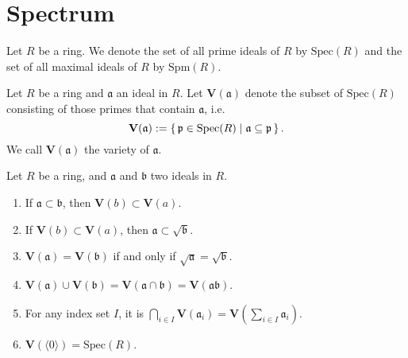 \chapter{Spectrum}

\begin{defn}[Spectrum]
    Let \(R\) be a ring. We denote the set of all prime ideals of \(R\) by \(\mathrm{Spec}(R)\) and the set of all maximal ideals of \(R\) by \(\mathrm{Spm}(R)\).
\end{defn}

\begin{defn}[Variety]
    Let \(R\) be a ring and \(\mathfrak{a}\) an ideal in \(R\). Let \(\mathbf{V}(\mathfrak{a})\) denote the subset of \(\mathrm{Spec}(R)\) consisting of those primes that contain \(\mathfrak{a}\), i.e.
    \begin{equation}
        \mathbf{V}(\mathfrak{a}) := \left\{\, \mathfrak{p} \in \mathrm{Spec}(R) \mathrel{\mid} \mathfrak{a} \subseteq \mathfrak{p} \,\right\}\text{.}
    \end{equation}
    We call \(\mathbf{V}(\mathfrak{a})\) the variety of \(\mathfrak{a}\).
\end{defn}

\begin{prps}
    Let \(R\) be a ring, and \(\mathfrak{a}\) and \(\mathfrak{b}\) two ideals in \(R\).
    \begin{enumerate}
        \item If \(\mathfrak{a} \subset \mathfrak{b}\), then \(\mathbf{V}(b) \subset \mathbf{V}(a)\).
        \item If \(\mathbf{V}(b) \subset \mathbf{V}(a)\), then \(\mathfrak{a} \subset \sqrt{\mathfrak{b}}\).
        \item \(\mathbf{V}(\mathfrak{a}) = \mathbf{V}(\mathfrak{b})\) if and only if \(\sqrt{\mathfrak{a}} = \sqrt{\mathfrak{b}}\).
        \item \(\mathbf{V}(\mathfrak{a}) \cup \mathbf{V}(\mathfrak{b}) = \mathbf{V}(\mathfrak{a} \cap \mathfrak{b}) = \mathbf{V}(\mathfrak{a}\mathfrak{b})\).
        \item For any index set \(I\), it is \(\bigcap_{i \in I}\mathbf{V}(\mathfrak{a}_i) = \mathbf{V}(\sum_{i \in I}\mathfrak{a}_i)\).
        \item \(\mathbf{V}(\langle 0 \rangle) = \mathrm{Spec}(R)\).
    \end{enumerate}
\end{prps}

